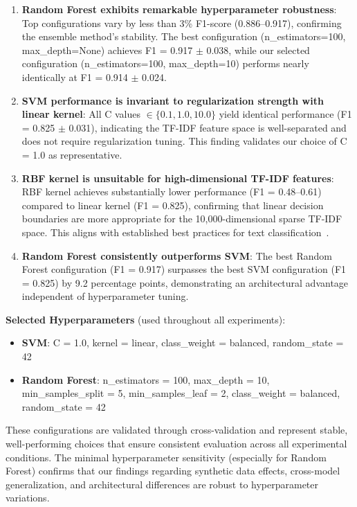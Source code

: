 \begin{enumerate}
    \item \textbf{Random Forest exhibits remarkable hyperparameter robustness}: Top configurations vary by less than 3\% F1-score (0.886--0.917), confirming the ensemble method's stability. The best configuration (n\_estimators=100, max\_depth=None) achieves F1 = 0.917 $\pm$ 0.038, while our selected configuration (n\_estimators=100, max\_depth=10) performs nearly identically at F1 = 0.914 $\pm$ 0.024.

    \item \textbf{SVM performance is invariant to regularization strength with linear kernel}: All C values $\in \{0.1, 1.0, 10.0\}$ yield identical performance (F1 = 0.825 $\pm$ 0.031), indicating the TF-IDF feature space is well-separated and does not require regularization tuning. This finding validates our choice of C = 1.0 as representative.

    \item \textbf{RBF kernel is unsuitable for high-dimensional TF-IDF features}: RBF kernel achieves substantially lower performance (F1 = 0.48--0.61) compared to linear kernel (F1 = 0.825), confirming that linear decision boundaries are more appropriate for the 10,000-dimensional sparse TF-IDF space. This aligns with established best practices for text classification~\cite{joachims1998text}.

    \item \textbf{Random Forest consistently outperforms SVM}: The best Random Forest configuration (F1 = 0.917) surpasses the best SVM configuration (F1 = 0.825) by 9.2 percentage points, demonstrating an architectural advantage independent of hyperparameter tuning.
\end{enumerate}

\textbf{Selected Hyperparameters} (used throughout all experiments):

\begin{itemize}
    \item \textbf{SVM}: C = 1.0, kernel = linear, class\_weight = balanced, random\_state = 42
    \item \textbf{Random Forest}: n\_estimators = 100, max\_depth = 10, min\_samples\_split = 5, min\_samples\_leaf = 2, class\_weight = balanced, random\_state = 42
\end{itemize}

These configurations are validated through cross-validation and represent stable, well-performing choices that ensure consistent evaluation across all experimental conditions. The minimal hyperparameter sensitivity (especially for Random Forest) confirms that our findings regarding synthetic data effects, cross-model generalization, and architectural differences are robust to hyperparameter variations.


